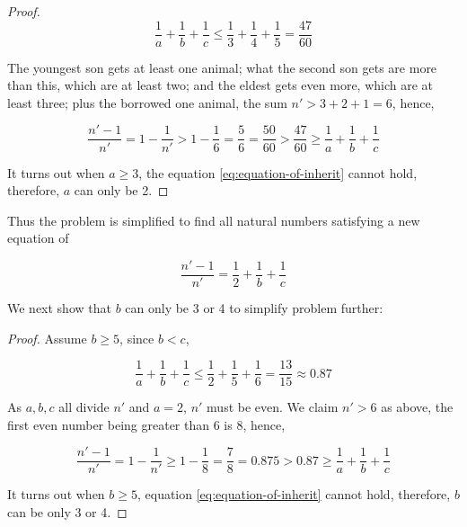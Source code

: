 \documentclass[b5paper]{article}
\begin{document}
\begin{Answer}[ref={ex:fractions}]
{\begin{proof}
\[
\frac{1}{a} + \frac{1}{b} + \frac{1}{c} \leq \frac{1}{3} + \frac{1}{4} + \frac{1}{5} = \frac{47}{60}
\]

The youngest son gets at least one animal; what the second son gets are more than this, which are at least two; and the eldest gets even more, which are at least three; plus the borrowed one animal, the sum $n' > 3 + 2 + 1 = 6$, hence,

\[
\frac{n'-1}{n'} = 1 - \frac{1}{n'} > 1 - \frac{1}{6} = \frac{5}{6} = \frac{50}{60} > \frac{47}{60} \geq \frac{1}{a} + \frac{1}{b} + \frac{1}{c}
\]

It turns out when $a \geq 3$, the equation \cref{eq:equation-of-inherit} cannot hold, therefore, $a$ can only be 2.
\end{proof}

Thus the problem is simplified to find all natural numbers satisfying a new equation of

\[
\frac{n'-1}{n'} = \frac{1}{2} + \frac{1}{b} + \frac{1}{c}
\]

We next show that $b$ can only be 3 or 4 to simplify problem further:

\begin{proof}
Assume $b \geq 5$, since $b < c$,

\[
\frac{1}{a} + \frac{1}{b} + \frac{1}{c} \leq \frac{1}{2} + \frac{1}{5} + \frac{1}{6} = \frac{13}{15} \approx 0.87
\]

As $a, b, c$ all divide $n'$ and $a = 2$, $n'$ must be even. We claim $n' > 6$ as above, the first even number being greater than 6 is 8, hence,

\[
\frac{n'-1}{n'} = 1 - \frac{1}{n'} \geq 1 - \frac{1}{8} = \frac{7}{8} = 0.875 > 0.87 \geq \frac{1}{a} + \frac{1}{b} + \frac{1}{c}
\]

It turns out when $b \geq 5$, equation \cref{eq:equation-of-inherit} cannot hold, therefore, $b$ can be only 3 or 4.
\end{proof}

}
\end{Answer}
\end{document}
